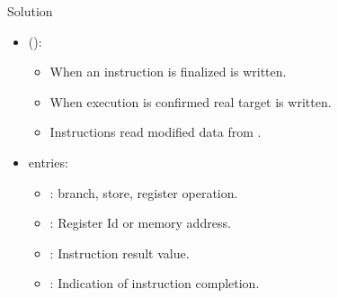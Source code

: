 \begin{frame}[t]{Solution}
\begin{itemize}
  \item {} ():
    \begin{itemize}
      \item When an instruction is finalized  is written.
      \item When execution is confirmed real target is written.
      \item Instructions read modified data from .
    \end{itemize}

  \item {} entries:
    \begin{itemize}
      \item {}: branch, store, register operation.
      \item {}: Register Id or memory address.
      \item {}: Instruction result value.
      \item {}: Indication of instruction completion.
    \end{itemize}
\end{itemize}
\end{frame}
